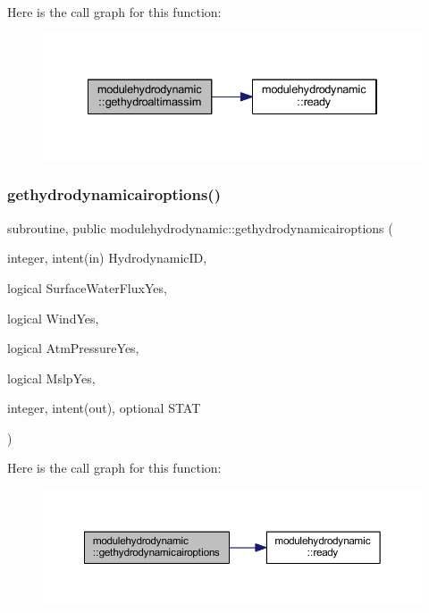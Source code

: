 Here is the call graph for this function\+:\nopagebreak
\begin{figure}[H]
\begin{center}
\leavevmode
\includegraphics[width=334pt]{namespacemodulehydrodynamic_a4d4e017a80d72328f2cdd7b71420fbf3_cgraph}
\end{center}
\end{figure}
\mbox{\label{namespacemodulehydrodynamic_a890cdf33bc8b461d93da82f9150c774e}} 
\subsubsection{\texorpdfstring{gethydrodynamicairoptions()}{gethydrodynamicairoptions()}}
{\footnotesize\ttfamily subroutine, public modulehydrodynamic\+::gethydrodynamicairoptions (\begin{DoxyParamCaption}\item[{integer, intent(in)}]{Hydrodynamic\+ID,  }\item[{logical}]{Surface\+Water\+Flux\+Yes,  }\item[{logical}]{Wind\+Yes,  }\item[{logical}]{Atm\+Pressure\+Yes,  }\item[{logical}]{Mslp\+Yes,  }\item[{integer, intent(out), optional}]{S\+T\+AT }\end{DoxyParamCaption})}

Here is the call graph for this function\+:\nopagebreak
\begin{figure}[H]
\begin{center}
\leavevmode
\includegraphics[width=350pt]{namespacemodulehydrodynamic_a890cdf33bc8b461d93da82f9150c774e_cgraph}
\end{center}
\end{figure}
\mbox{\label{namespacemodulehydrodynamic_ab585744f4ba5d5552dabea7edb88d98b}} 
